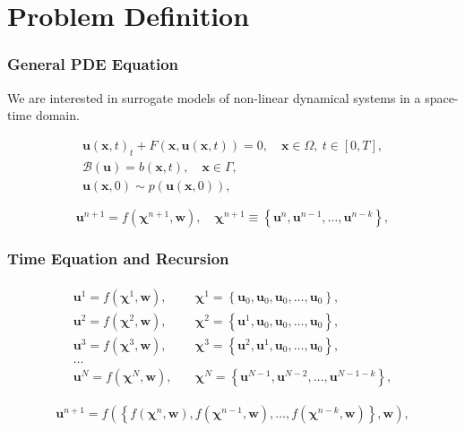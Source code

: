 \documentclass{beamer}
\theoremstyle{remark}
\begin{document}
\section{Problem Definition}

\begin{frame}
\frametitle{General PDE Equation}

We are interested in surrogate models of non-linear dynamical systems in a space-time domain.

\begin{equation}
    \begin{gathered}
    \bm{u}(\bm{x},t)_{t}+F\left(\bm{x}, \bm{u}\left(\bm{x},t\right)\right) = 0, \quad  \bm{x}\in\Omega, \: t\in[0,T],\\ 
    \mathcal{B}(\bm{u}) = b\left(\bm{x},t\right), \quad \bm{x}\in\Gamma,\\
    \bm{u}(\bm{x},0) \sim p\left(\bm{u}(\bm{x},0)\right),
    \end{gathered}
    \label{eq:general-pde}
\end{equation}

\begin{equation}
    \bm{u}^{n+1} = f\left(\bm{\chi}^{n+1}, \textbf{w}\right), \quad \bm{\chi}^{n+1} \equiv \left\{\bm{u}^{n}, \bm{u}^{n-1}, \ldots, \bm{u}^{n-k} \right\},
    \label{eq:time-integration}
\end{equation}

\end{frame}

\begin{frame}
\frametitle{Time Equation and Recursion}
\begin{align}
\begin{split}
    \bm{u}^{1} = f\left(\bm{\chi}^{1}, \textbf{w}\right), &\quad \bm{\chi}^{1} = \left\{\bm{u}_{0}, \bm{u}_{0}, \bm{u}_{0}, \ldots, \bm{u}_{0} \right\},\\
    \bm{u}^{2} = f\left(\bm{\chi}^{2}, \textbf{w}\right), &\quad \bm{\chi}^{2} = \left\{\bm{u}^{1}, \bm{u}_{0}, \bm{u}_{0}, \ldots, \bm{u}_{0} \right\},\\
    \bm{u}^{3} = f\left(\bm{\chi}^{3}, \textbf{w}\right), &\quad \bm{\chi}^{3} = \left\{\bm{u}^{2}, \bm{u}^{1}, \bm{u}_{0}, \ldots, \bm{u}_{0} \right\},\\
    \ldots \\
    \bm{u}^{N} = f\left(\bm{\chi}^{N}, \textbf{w}\right), &\quad \bm{\chi}^{N} = \left\{\bm{u}^{N-1}, \bm{u}^{N-2}, \ldots, \bm{u}^{N-1-k} \right\},
    \label{eq:time-int}
\end{split}
\end{align}

\begin{equation}
    \bm{u}^{n+1} = f\left(\left\{ f\left(\bm{\chi}^{n}, \textbf{w}\right), f\left(\bm{\chi}^{n-1}, \textbf{w}\right), \ldots, f\left(\bm{\chi}^{n-k}, \textbf{w}\right) \right\}, \textbf{w}\right),
    \label{eq:recursive}
\end{equation}

\end{frame}
\end{document}
